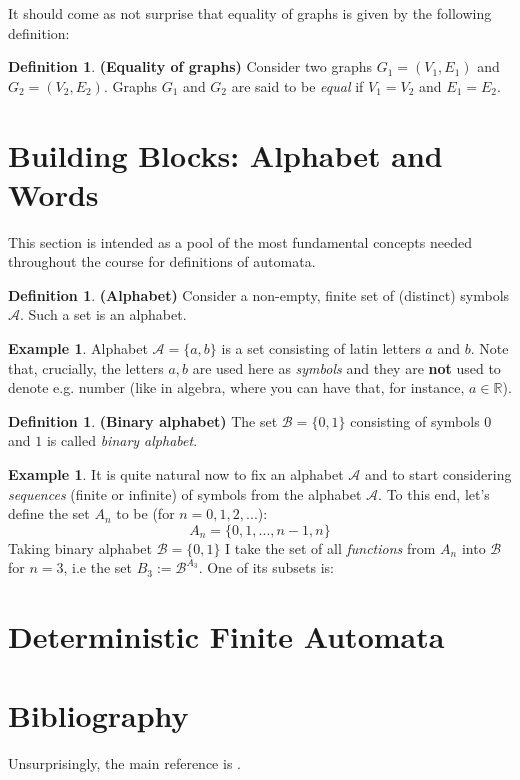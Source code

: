 \documentclass[12pt]{article}
\theoremstyle{plain}
\theoremstyle{definition}
\newtheorem{defn}[thm]{Definition}
\newtheorem{exmp}[thm]{Example}
\begin{document}
It should come as not surprise that equality of graphs is given by the following 
definition:

\begin{defn}
\textbf{(Equality of graphs)} Consider two graphs $G_1 = (V_1, E_1)$ and
$G_2 = (V_2, E_2)$. Graphs $G_1$ and $G_2$ are said to be \textit{equal} if 
$V_1 = V_2$ and $E_1 = E_2$.
\end{defn}

\section{Building Blocks: Alphabet and Words}

This section is intended as a pool of the most fundamental concepts needed throughout the 
course for definitions of automata. 

\begin{defn} \textbf{(Alphabet)} Consider a non-empty, finite set of (distinct) symbols 
$\mathcal{A}$. Such a set is an alphabet.
\end{defn}

\begin{exmp}
Alphabet $\mathcal{A} = \{a, b\}$ is a set consisting of latin letters $a$ and $b$. Note 
that, crucially, the letters $a, b$ are used here as \textit{symbols} and they are 
\textbf{not} used to denote e.g. number (like in algebra, where you can have that, 
for instance, $a \in \mathbb{R} $).
\end{exmp}

\begin{defn}
\textbf{(Binary alphabet)} The set $\mathcal{B} = \{ 0, 1 \}$ consisting of symbols
$0$ and $1$ is called \textit{binary alphabet}.
\end{defn}

\begin{exmp}
It is quite natural now to fix an alphabet $\mathcal{A}$ and to start considering
 \textit{sequences} (finite or infinite) of symbols from the alphabet $\mathcal{A}$.
 To this end, let's define the set $A_n$ to be (for $n = 0, 1, 2, ...$):
\begin{equation*}
A_n = \{ 0, 1, ..., n-1, n \}
\end{equation*}
Taking binary alphabet $\mathcal{B} = \{0, 1 \}$ I take the set of all 
\textit{functions} from $A_n$ into $\mathcal{B}$ for $n=3$, i.e the set 
$B_3 := \mathcal{B}^{A_3}$. One of its subsets is:


\end{exmp}


\section{Deterministic Finite Automata}

\section{Bibliography}
Unsurprisingly, the main reference is \cite{intro_to_automata_theory}.



\end{document}

